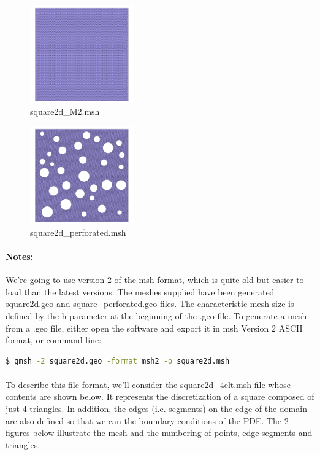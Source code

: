 \documentclass[english,10pt,a4paper]{article}
\begin{document}
\begin{multicols}{2}
  \begin{figure}[H]
  \centering
  \includegraphics[width=0.4\textwidth]{docs/modules/ROOT/images/square2d_M2.png}
  \caption{square2d\_M2.msh}
  \label{fig:mesh_square2d_M2}
  \end{figure}
  \columnbreak
  \begin{figure}[H]
  \centering
  \includegraphics[width=0.4\textwidth]{docs/modules/ROOT/images/square2d_perforated.png}
  \caption{square2d\_perforated.msh}
  \label{fig:mesh_square2d_perforated}
  \end{figure}
\end{multicols}


\paragraph{Notes:} We're going to use version 2 of the msh format, which is quite old but easier to load than the latest versions. The meshes supplied have been generated
square2d.geo and square\_perforated.geo files. The characteristic mesh size is defined by the h parameter at the beginning of the .geo file.
To generate a mesh from a .geo file, either open the software and export it in msh Version 2 ASCII format, or
command line: 
\begin{lstlisting}[language=bash]
$ gmsh -2 square2d.geo -format msh2 -o square2d.msh
\end{lstlisting}

\paragraph{}
To describe this file format, we'll consider the square2d\_4elt.msh file whose contents are shown below.
It represents the discretization of a square composed of just 4 triangles. In addition, the edges (i.e. segments) on the edge of the domain are also defined so that we can
the boundary conditions of the PDE. The 2 figures below illustrate the mesh and the numbering of points, edge segments and triangles.
\end{document}
